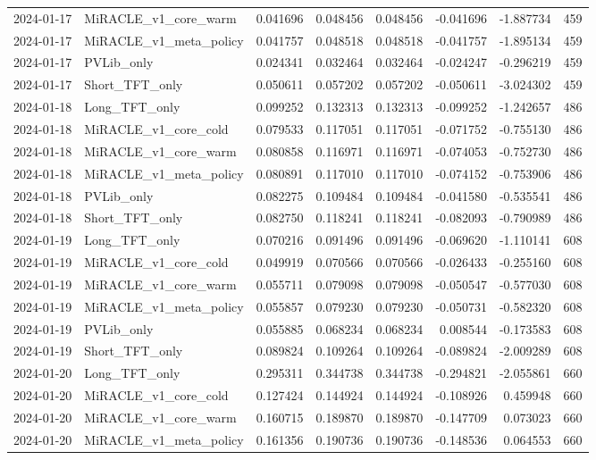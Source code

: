 \begin{tabular}{llrrrrrr}
2024-01-17 & MiRACLE_v1_core_warm & 0.041696 & 0.048456 & 0.048456 & -0.041696 & -1.887734 & 459 \\
2024-01-17 & MiRACLE_v1_meta_policy & 0.041757 & 0.048518 & 0.048518 & -0.041757 & -1.895134 & 459 \\
2024-01-17 & PVLib_only & 0.024341 & 0.032464 & 0.032464 & -0.024247 & -0.296219 & 459 \\
2024-01-17 & Short_TFT_only & 0.050611 & 0.057202 & 0.057202 & -0.050611 & -3.024302 & 459 \\
2024-01-18 & Long_TFT_only & 0.099252 & 0.132313 & 0.132313 & -0.099252 & -1.242657 & 486 \\
2024-01-18 & MiRACLE_v1_core_cold & 0.079533 & 0.117051 & 0.117051 & -0.071752 & -0.755130 & 486 \\
2024-01-18 & MiRACLE_v1_core_warm & 0.080858 & 0.116971 & 0.116971 & -0.074053 & -0.752730 & 486 \\
2024-01-18 & MiRACLE_v1_meta_policy & 0.080891 & 0.117010 & 0.117010 & -0.074152 & -0.753906 & 486 \\
2024-01-18 & PVLib_only & 0.082275 & 0.109484 & 0.109484 & -0.041580 & -0.535541 & 486 \\
2024-01-18 & Short_TFT_only & 0.082750 & 0.118241 & 0.118241 & -0.082093 & -0.790989 & 486 \\
2024-01-19 & Long_TFT_only & 0.070216 & 0.091496 & 0.091496 & -0.069620 & -1.110141 & 608 \\
2024-01-19 & MiRACLE_v1_core_cold & 0.049919 & 0.070566 & 0.070566 & -0.026433 & -0.255160 & 608 \\
2024-01-19 & MiRACLE_v1_core_warm & 0.055711 & 0.079098 & 0.079098 & -0.050547 & -0.577030 & 608 \\
2024-01-19 & MiRACLE_v1_meta_policy & 0.055857 & 0.079230 & 0.079230 & -0.050731 & -0.582320 & 608 \\
2024-01-19 & PVLib_only & 0.055885 & 0.068234 & 0.068234 & 0.008544 & -0.173583 & 608 \\
2024-01-19 & Short_TFT_only & 0.089824 & 0.109264 & 0.109264 & -0.089824 & -2.009289 & 608 \\
2024-01-20 & Long_TFT_only & 0.295311 & 0.344738 & 0.344738 & -0.294821 & -2.055861 & 660 \\
2024-01-20 & MiRACLE_v1_core_cold & 0.127424 & 0.144924 & 0.144924 & -0.108926 & 0.459948 & 660 \\
2024-01-20 & MiRACLE_v1_core_warm & 0.160715 & 0.189870 & 0.189870 & -0.147709 & 0.073023 & 660 \\
2024-01-20 & MiRACLE_v1_meta_policy & 0.161356 & 0.190736 & 0.190736 & -0.148536 & 0.064553 & 660 \\

\end{tabular}

